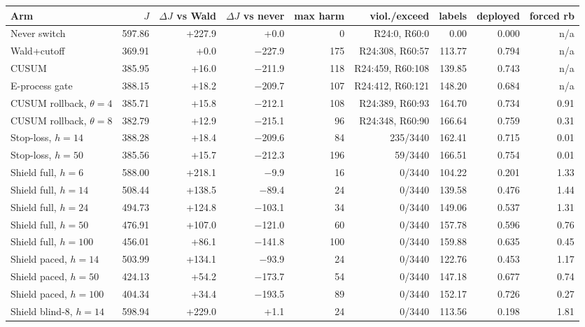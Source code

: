 \begin{tabular}{@{}l r r r r r r r r@{}}
\toprule
Arm & $J$ & $\Delta J$ vs Wald & $\Delta J$ vs never & max harm & viol./exceed & labels & deployed & forced rb \\
\midrule
Never switch & 597.86 & +227.9 & +0.0 & 0 & R24:0, R60:0 & 0.00 & 0.000 & n/a \\
Wald+cutoff & 369.91 & +0.0 & $-$227.9 & 175 & R24:308, R60:57 & 113.77 & 0.794 & n/a \\
CUSUM & 385.95 & +16.0 & $-$211.9 & 118 & R24:459, R60:108 & 139.85 & 0.743 & n/a \\
E-process gate & 388.15 & +18.2 & $-$209.7 & 107 & R24:412, R60:121 & 148.20 & 0.684 & n/a \\
CUSUM rollback, $\theta=4$ & 385.71 & +15.8 & $-$212.1 & 108 & R24:389, R60:93 & 164.70 & 0.734 & 0.91 \\
CUSUM rollback, $\theta=8$ & 382.79 & +12.9 & $-$215.1 & 96 & R24:348, R60:90 & 166.64 & 0.759 & 0.31 \\
Stop-loss, $h=14$ & 388.28 & +18.4 & $-$209.6 & 84 & 235/3440 & 162.41 & 0.715 & 0.01 \\
Stop-loss, $h=50$ & 385.56 & +15.7 & $-$212.3 & 196 & 59/3440 & 166.51 & 0.754 & 0.01 \\
Shield full, $h=6$ & 588.00 & +218.1 & $-$9.9 & 16 & 0/3440 & 104.22 & 0.201 & 1.33 \\
Shield full, $h=14$ & 508.44 & +138.5 & $-$89.4 & 24 & 0/3440 & 139.58 & 0.476 & 1.44 \\
Shield full, $h=24$ & 494.73 & +124.8 & $-$103.1 & 34 & 0/3440 & 149.06 & 0.537 & 1.31 \\
Shield full, $h=50$ & 476.91 & +107.0 & $-$121.0 & 60 & 0/3440 & 157.78 & 0.596 & 0.76 \\
Shield full, $h=100$ & 456.01 & +86.1 & $-$141.8 & 100 & 0/3440 & 159.88 & 0.635 & 0.45 \\
Shield paced, $h=14$ & 503.99 & +134.1 & $-$93.9 & 24 & 0/3440 & 122.76 & 0.453 & 1.17 \\
Shield paced, $h=50$ & 424.13 & +54.2 & $-$173.7 & 54 & 0/3440 & 147.18 & 0.677 & 0.74 \\
Shield paced, $h=100$ & 404.34 & +34.4 & $-$193.5 & 89 & 0/3440 & 152.17 & 0.726 & 0.27 \\
Shield blind-8, $h=14$ & 598.94 & +229.0 & +1.1 & 24 & 0/3440 & 113.56 & 0.198 & 1.81 \\
\bottomrule
\end{tabular}
